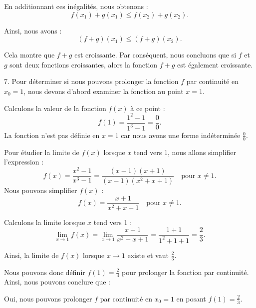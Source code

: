 \documentclass[12pt]{article}
\begin{document}
En additionnant ces inégalités, nous obtenons :
\[
f(x_1) + g(x_1) \leq f(x_2) + g(x_2).
\]

Ainsi, nous avons :
\[
(f + g)(x_1) \leq (f + g)(x_2).
\]

Cela montre que \( f + g \) est croissante. Par conséquent, nous concluons que si \( f \) et \( g \) sont deux fonctions croissantes, alors la fonction \( f + g \) est également croissante.

7. Pour déterminer si nous pouvons prolonger la fonction \( f \) par continuité en \( x_0 = 1 \), nous devons d'abord examiner la fonction au point \( x = 1 \). 

Calculons la valeur de la fonction \( f(x) \) à ce point :
\[
f(1) = \frac{1^2 - 1}{1^3 - 1} = \frac{0}{0}.
\]
La fonction n'est pas définie en \( x = 1 \) car nous avons une forme indéterminée \( \frac{0}{0} \).

Pour étudier la limite de \( f(x) \) lorsque \( x \) tend vers 1, nous allons simplifier l'expression :
\[
f(x) = \frac{x^2 - 1}{x^3 - 1} = \frac{(x - 1)(x + 1)}{(x - 1)(x^2 + x + 1)} \quad \text{pour } x \neq 1.
\]
Nous pouvons simplifier \( f(x) \) :
\[
f(x) = \frac{x + 1}{x^2 + x + 1} \quad \text{pour } x \neq 1.
\]

Calculons la limite lorsque \( x \) tend vers 1 :
\[
\lim_{x \to 1} f(x) = \lim_{x \to 1} \frac{x + 1}{x^2 + x + 1} = \frac{1 + 1}{1^2 + 1 + 1} = \frac{2}{3}.
\]

Ainsi, la limite de \( f(x) \) lorsque \( x \to 1 \) existe et vaut \( \frac{2}{3} \).

Nous pouvons donc définir \( f(1) = \frac{2}{3} \) pour prolonger la fonction par continuité. Ainsi, nous pouvons conclure que :

Oui, nous pouvons prolonger \( f \) par continuité en \( x_0 = 1 \) en posant \( f(1) = \frac{2}{3} \).
\end{document}

